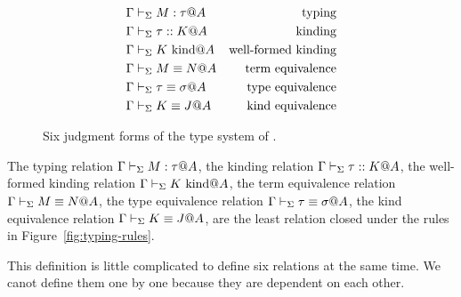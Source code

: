 \begin{figure}
	\begin{center}
		\begin{align*}
			\Gamma & \vdash_\Sigma M : \tau @ A       & \text{typing}              \\
			\Gamma & \vdash_\Sigma \tau :: K @ A      & \text{kinding}             \\
			\Gamma & \vdash_\Sigma K \text{\ kind} @ A      & \text{well-formed kinding} \\
			\Gamma & \vdash_\Sigma M \equiv N @ A         & \text{term equivalence}    \\
			\Gamma & \vdash_\Sigma \tau \equiv \sigma @ A & \text{type equivalence}    \\
			\Gamma & \vdash_\Sigma K \equiv J @ A         & \text{kind equivalence}
		\end{align*}
		\caption{Six judgment forms of the type system of \LMD.}
		\label{fig:LMD-six-judgments}
	\end{center}
\end{figure}

\begin{definition}
	The typing relation $ \Gamma \vdash_\Sigma M : \tau @ A $,
	the kinding relation $\Gamma \vdash_\Sigma \tau :: K @ A$,
	the well-formed kinding relation $\Gamma \vdash_\Sigma K \text{\ kind} @ A$,
	the term equivalence relation $\Gamma \vdash_\Sigma M \equiv N @ A$,
	the type equivalence relation $\Gamma \vdash_\Sigma \tau \equiv \sigma @ A$,
	the kind equivalence relation $\Gamma \vdash_\Sigma K \equiv J @ A$,
	are the least relation closed under the rules in Figure~\ref{fig:typing-rules}.
\end{definition}
This definition is little complicated to define six relations at the same time.
We canot define them one by one because they are dependent on each other.

